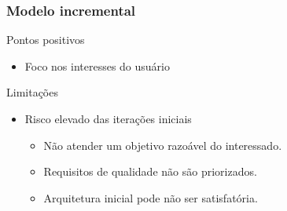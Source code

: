 \begin{frame}[hasnext=false, hasprev=true]
	\frametitle{Modelo incremental}

	\begin{block:fact}{Pontos positivos}
		\begin{itemize}
			\item Foco nos interesses do usuário
		\end{itemize}
	\end{block:fact}

	\begin{block:fact}{Limitações}
		\begin{itemize}
			\item Risco elevado das iterações iniciais~\cite{Boehm:1996}
			\begin{itemize}
				\item Não atender um objetivo razoável do interessado.
				\item Requisitos de qualidade não são priorizados.
				\item Arquitetura inicial pode não ser satisfatória.
			\end{itemize}
		\end{itemize}
	\end{block:fact}
	
\end{frame}